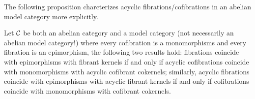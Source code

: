 The following proposition charcterizes acyclic fibrations/cofibrations in an abelian model category more explicitly.

\begin{proposition}
	\label{prop:acyc-in-ab}
	Let $\mathcal{C}$ be both an abelian category and a model category (not necessarily an abelian model category!) where every cofibration is a monomorphisms and every fibration is an epimorphism, the following two results hold: fibrations coincide with epimorphisms with fibrant kernels if and only if acyclic cofibrations coincide with monomorphisms with acyclic cofibrant cokernels; similarly, acyclic fibrations coincide with epimorphisms with acyclic fibrant kernels if and only if cofibrations
	coincide with monomorphisms with cofibrant cokernels.
\end{proposition}

